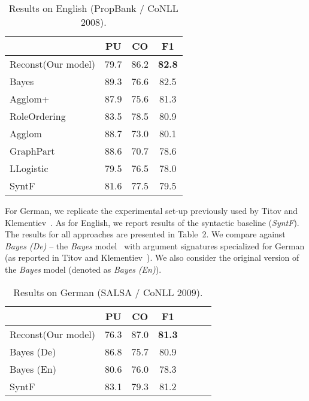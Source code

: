 \begin{table}[t]
\caption{Results on English (PropBank / CoNLL 2008).}
\begin{center}

\begin{tabular} {l c c c}  %

\label{tab:en}
                & PU & CO & F1 \\
\hline
Reconst(Our model)         & 79.7 & 86.2 & {\bf 82.8}   \\
Bayes           & 89.3 & 76.6 & 82.5   \\
Agglom+          &  87.9 & 75.6 & 81.3 \\
RoleOrdering    & 83.5 & 78.5 & 80.9 \\
Agglom        & 88.7 & 73.0 & 80.1   \\
GraphPart		  &	88.6 & 70.7 & 78.6   \\
LLogistic         & 79.5 & 76.5 & 78.0   \\

\hline
SyntF		      & 81.6 & 77.5 & 79.5   \\
\end{tabular}

\end{center}
\end{table}



For German, we replicate the experimental set-up previously
used by Titov and Klementiev~\citet{TitovAcl2012}. As for English,
we report results of the syntactic baseline ({\em SyntF}).  
The results for all approaches are presented in Table~2.
We compare against {\em Bayes (De)} -- the {\em Bayes} model~
with argument signatures specialized for German (as reported in Titov and
Klementiev~\citet{TitovAcl2012}).
We also consider the original version of the {\em Bayes} model (denoted as {\em Bayes (En)}).
 
\begin{table}
\caption{Results on German (SALSA / CoNLL 2009).}
\begin{center}
\begin{tabular}{l*{5}{c}r}
                & PU & CO & F1 \\
\hline
Reconst(Our model)         & 76.3 & 87.0 & \textbf{81.3}   \\
Bayes (De)         		   & 86.8 & 75.7 & 80.9   \\
Bayes (En) 				   & 80.6 & 76.0 & 78.3 \\
\hline
SyntF		      & 83.1 & 79.3 & 81.2  \\
\end{tabular}
\end{center}

\end{table}

